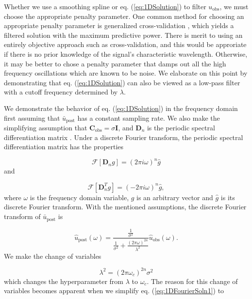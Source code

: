 \documentclass[10pt,a4paper]{article}
\begin{document}
Whether we use a smoothing spline or eq. (\ref{eq:1DSolution}) to filter $u_\mathrm{obs}$, we must choose the appropriate penalty parameter.  One common method for choosing an appropriate penalty parameter is generalized cross-validation \citep{Craven1979}, which yields a filtered solution with the maximum predictive power.  There is merit to using an entirely objective approach such as cross-validation, and this would be approriate if there is no prior knowledge of the signal's characteristic wavelength.  Otherwise, it may be better to chose a penalty parameter that damps out all the high frequency oscillations which are known to be noise.  We elaborate on this point by demonstrating that eq. (\ref{eq:1DSolution}) can also be viewed as a low-pass filter with a cutoff frequency determined by $\lambda$. 

We demonstrate the behavior of eq. (\ref{eq:1DSolution}) in the frequency domain first assuming that $\bar{u}_\mathrm{post}$ has a constant sampling rate.  We also make the simplifying assumption that $\mathbf{C}_\mathrm{obs} = \sigma \mathbf{I}$, and $\mathbf{D}_n$ is the periodic spectral differentiation matrix \citep[e.g.][]{Trefethen2000}.  Under a discrete Fourier transform, the periodic spectral differentiation matrix has the properties 

\begin{equation}\label{eq:Property1}
  \mathcal{F}[\mathbf{D}_ng] = (2\pi i\omega)^n \hat{g}
\end{equation}
and

\begin{equation}\label{eq:Property2}
  \mathcal{F}[\mathbf{D}^T_ng] = (-2\pi i\omega)^n \hat{g},
\end{equation}
where $\omega$ is the frequency domain variable, $g$ is an arbitrary vector and $\hat{g}$ is its discrete Fourier transform. With the mentioned assumptions, the discrete Fourier transform of $\bar{u}_\mathrm{post}$ is 

\begin{equation}\label{eq:1DFourierSoln1}
\hat{u}_\mathrm{post}(\omega) = \frac{\frac{1}{\sigma^2}}
                                  {\frac{1}{\sigma^2} +                  
                                  \frac{(2\pi\omega)^{2n}}{\lambda^2}}
                                  \hat{u}_\mathrm{obs}(\omega).
\end{equation}
We make the change of variables 

\begin{equation}\label{eq:VariableChange}
\lambda^2 = (2\pi\omega_c)^{2n}\sigma^2
\end{equation}
which changes the hyperparameter from $\lambda$ to $\omega_c$.  The reason for this change of variables becomes apparent when we simplify eq. (\ref{eq:1DFourierSoln1}) to
\end{document}
